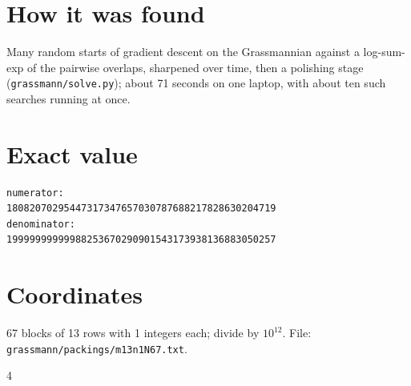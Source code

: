 \documentclass[11pt,a4paper]{article}
\begin{document}
\section{How it was found}
Many random starts of gradient descent on the Grassmannian against a log-sum-exp of the pairwise overlaps, sharpened over time, then a polishing stage (\texttt{grassmann/solve.py}); about 71 seconds on one laptop, with about ten such searches running at once.


\appendix
\section{Exact value}
{\small
\begin{verbatim}
numerator:
18082070295447317347657030787688217828630204719
denominator:
19999999999988253670290901543173938136883050257
\end{verbatim}}

\section{Coordinates}
67 blocks of 13 rows with 1 integers each; divide by $10^{12}$. File: \texttt{grassmann/packings/m13n1N67.txt}.
{\tiny
\begin{multicols}{4}
\end{multicols}}
\end{document}
